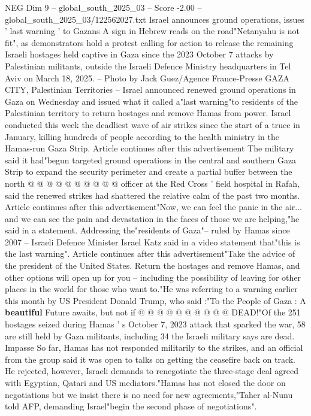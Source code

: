 \begin{textsample}{NEG Dim 9 – global\_south\_2025\_03 – Score -2.00 – global\_south\_2025\_03/122562027.txt}  \label{ex:f9_neg_323}
Israel announces ground operations, issues ' last warning ' to Gazans A sign in Hebrew reads on the road"Netanyahu is not fit", as demonstrators hold a protest calling for action to release the remaining Israeli hostages held captive in Gaza since the 2023 October 7 attacks by Palestinian militants, outside the Israeli Defence Ministry headquarters in Tel Aviv on March 18, 2025. -- Photo by Jack Guez/Agence France-Presse GAZA CITY, Palestinian Territories -- Israel announced renewed ground operations in Gaza on Wednesday and issued what it called a"last warning"to residents of the Palestinian territory to return hostages and remove Hamas from power.
Israel conducted this week the deadliest wave of air strikes since the start of a truce in January, killing hundreds of people according to the health ministry in the Hamas-run Gaza Strip.
Article continues after this advertisement The military said it had"begun targeted ground operations in the central and southern Gaza Strip to expand the security perimeter and create a partial buffer between the north @ @ @ @ @ @ @ @ @ @ officer at the Red Cross ' field hospital in Rafah, said the renewed strikes had shattered the relative calm of the past two months.
Article continues after this advertisement"Now, we can feel the panic in the air... and we can see the pain and devastation in the faces of those we are helping,"he said in a statement.
Addressing the"residents of Gaza"-- ruled by Hamas since 2007 -- Israeli Defence Minister Israel Katz said in a video statement that"this is the last warning".
Article continues after this advertisement"Take the advice of the president of the United States.
Return the hostages and remove Hamas, and other options will open up for you -- including the possibility of leaving for other places in the world for those who want to."He was referring to a warning earlier this month by US President Donald Trump, who said :"To the People of Gaza : A \textbf{beautiful} Future awaits, but not if @ @ @ @ @ @ @ @ @ @ DEAD!"Of the 251 hostages seized during Hamas ' s October 7, 2023 attack that sparked the war, 58 are still held by Gaza militants, including 34 the Israeli military says are dead.
Impasse So far, Hamas has not responded militarily to the strikes, and an official from the group said it was open to talks on getting the ceasefire back on track.
He rejected, however, Israeli demands to renegotiate the three-stage deal agreed with Egyptian, Qatari and US mediators."Hamas has not closed the door on negotiations but we insist there is no need for new agreements,"Taher al-Nunu told AFP, demanding Israel"begin the second phase of negotiations".

\end{textsample}
